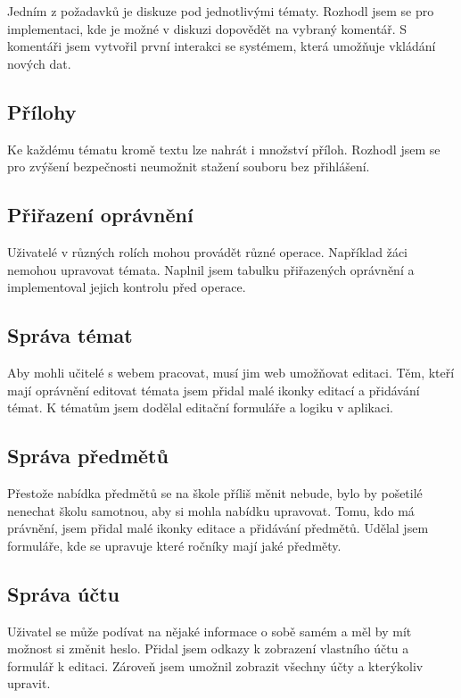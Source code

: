 \documentclass[thesis=B,czech]{FITthesis}[2012/06/26]
\begin{document}
Jedním z požadavků je diskuze pod jednotlivými tématy. Rozhodl jsem se pro implementaci, kde je možné v diskuzi dopovědět na vybraný komentář. S komentáři jsem vytvořil první interakci se systémem, která umožňuje vkládání nových dat.

\subsection{Přílohy}

Ke každému tématu kromě textu lze nahrát i množství příloh. Rozhodl jsem se pro zvýšení bezpečnosti neumožnit stažení souboru bez přihlášení.

\subsection{Přiřazení oprávnění}

Uživatelé v různých rolích mohou provádět různé operace. Například žáci nemohou upravovat témata. Naplnil jsem tabulku přiřazených oprávnění a implementoval jejich kontrolu před operace.

\subsection{Správa témat}

Aby mohli učitelé s webem pracovat, musí jim web umožňovat editaci. Těm, kteří mají oprávnění editovat témata jsem přidal malé ikonky editací a přidávání témat. K tématům jsem dodělal editační formuláře a logiku v aplikaci.

\subsection{Správa předmětů}

Přestože nabídka předmětů se na škole příliš měnit nebude, bylo by pošetilé nenechat školu samotnou, aby si mohla nabídku upravovat. Tomu, kdo má právnění, jsem přidal malé ikonky editace a přidávání předmětů. Udělal jsem formuláře, kde se upravuje které ročníky mají jaké předměty.

\subsection{Správa účtu}

Uživatel se může podívat na nějaké informace o sobě samém a měl by mít možnost si změnit heslo. Přidal jsem odkazy k zobrazení vlastního účtu a formulář k editaci. Zároveň jsem umožnil zobrazit všechny účty a kterýkoliv upravit.
\end{document}

